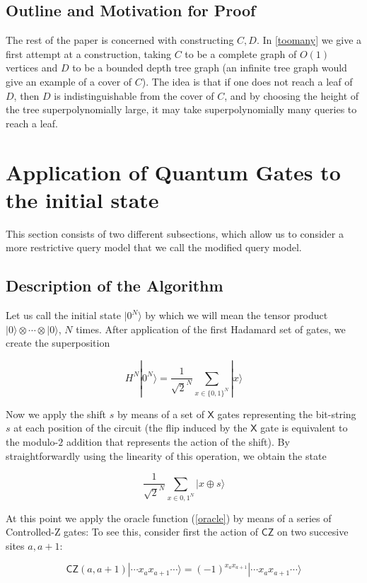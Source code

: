 \documentclass[letterpaper,onecolumn]{quantumarticle}
\begin{document}
\subsection{Outline and Motivation for Proof}

The rest of the paper is concerned with constructing $C,D$.
In  \cref{toomany} we give a first attempt at a construction, taking $C$ to be a complete graph of $O(1)$ vertices and $D$ to be a bounded depth tree graph (an infinite tree graph would give an example of a cover of $C$).
The idea is that if one does not reach a leaf of $D$, then $D$ is indistinguishable from the cover of $C$, and by choosing the
height of the tree superpolynomially large, it may take superpolynomially many queries to reach a leaf.

\section{Application of Quantum Gates to the initial state}
\label{gates}
This section consists of two different subsections, which allow us to consider a more restrictive query model that we call the modified query model.

\subsection{Description of the Algorithm}

Let us call the initial state $|0^N\rangle$ by which we will mean the tensor product $|0\rangle \otimes \cdots \otimes |0\rangle$, $N$ times. After application of the first Hadamard set of gates, we create the superposition 

$$H^N |0^N \rangle = \frac{1}{\sqrt{2}^N} \sum_{x\in \{0,1\}^N} |x\rangle$$

\noindent Now we apply the shift $s$ by means of a set of $\textsf{X}$ gates representing the bit-string $s$ at each position of the circuit (the flip induced by the $\textsf{X}$ gate is equivalent to the modulo-$2$ addition that represents the action of the shift). By straightforwardly using  the linearity of this operation, we obtain the state 

$$\frac{1}{\sqrt{2}^N} \sum_{x\in {0,1}^N} |x \oplus s\rangle$$

\noindent At this point we apply the oracle function (\ref{oracle}) by means of a series of \textsf{Controlled-Z} gates: To see this, consider first the action of $\textsf{CZ}$ on two succesive sites $a,a+1$:

$$
\textsf{CZ}(a,a+1) |\cdots x_a x_{a+1} \cdots \rangle= (-1)^{x_a x_{a+1}} |\cdots x_a x_{a+1} \cdots \rangle
$$
\end{document}
